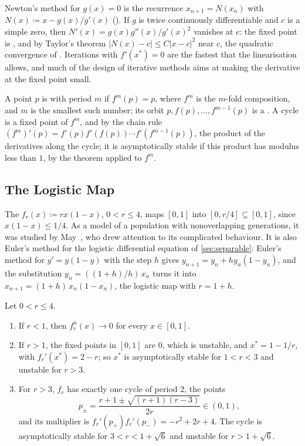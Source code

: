 Newton's method for $g(x)=0$ is the recurrence $x_{n+1}=N(x_n)$ with $N(x)\coloneqq x-g(x)/g'(x)$ (). If $g$ is twice continuously differentiable and $c$ is a simple zero, then $N'(x)=g(x)g''(x)/g'(x)^2$ vanishes at $c$: the fixed point is , and by Taylor's theorem $|N(x)-c|\le C|x-c|^2$ near $c$, the quadratic convergence of . Iterations with $f'(x^*)=0$ are the fastest that the linearisation allows, and much of the design of iterative methods aims at making the derivative at the fixed point small.

A point $p$ is  with period $m$ if $f^m(p)=p$, where $f^m$ is the $m$-fold composition, and $m$ is the smallest such number; its orbit $p,f(p),\ldots,f^{m-1}(p)$ is a . A cycle is a fixed point of $f^m$, and by the chain rule $(f^m)'(p)=f'(p)f'(f(p))\cdots f'(f^{m-1}(p))$, the product of the derivatives along the cycle; it is asymptotically stable if this product has modulus less than $1$, by the theorem applied to $f^m$.

\subsection{The Logistic Map}

The  $f_r(x)\coloneqq rx(1-x)$, $0<r\le4$, maps $[0,1]$ into $[0,r/4]\subseteq[0,1]$, since $x(1-x)\le1/4$. As a model of a population with nonoverlapping generations, it was studied by May~\cite{may1976}, who drew attention to its complicated behaviour. It is also Euler's method for the logistic differential equation of \cref{sec:separable}: Euler's method for $y'=y(1-y)$ with the step $h$ gives $y_{n+1}=y_n+hy_n(1-y_n)$, and the substitution $y_n=((1+h)/h)\,x_n$ turns it into $x_{n+1}=(1+h)\,x_n(1-x_n)$, the logistic map with $r=1+h$.

\begin{proposition}
\label{prop:logistic-two-cycle}
Let $0<r\le4$.
\begin{enumerate}
\item If $r<1$, then $f_r^n(x)\to0$ for every $x\in[0,1]$.
\item If $r>1$, the fixed points in $[0,1]$ are $0$, which is unstable, and $x^*=1-1/r$, with $f_r'(x^*)=2-r$; so $x^*$ is asymptotically stable for $1<r<3$ and unstable for $r>3$.
\item For $r>3$, $f_r$ has exactly one cycle of period $2$, the points
\[
p_\pm=\frac{r+1\pm\sqrt{(r+1)(r-3)}}{2r}\in(0,1),
\]
and its multiplier is $f_r'(p_+)f_r'(p_-)=-r^2+2r+4$. The cycle is asymptotically stable for $3<r<1+\sqrt6$ and unstable for $r>1+\sqrt6$.
\end{enumerate}
\end{proposition}

